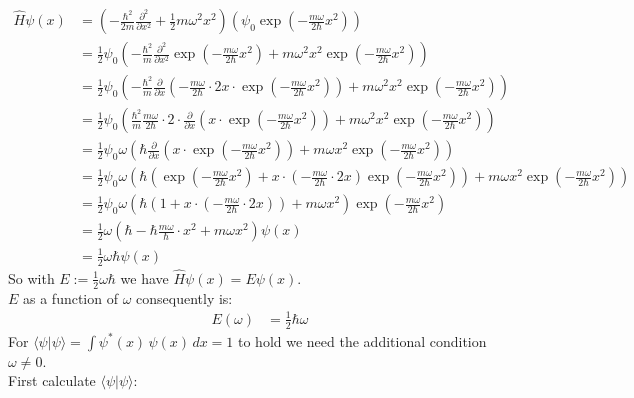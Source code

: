 \documentclass{article}
\begin{document}
  \begin{align*}
      \hat{H}\psi(x) &= \left(-\frac{\hbar^2}{2m}\frac{\partial^2}{\partial x^2} + \frac{1}{2}m\omega^2x^2\right)\left(\psi_0\exp\left(-\frac{m\omega}{2\hbar}x^2\right)\right)\\
      &= \frac{1}{2}\psi_0\left(-\frac{\hbar^2}{m}\frac{\partial^2}{\partial x^2}\exp\left(-\frac{m\omega}{2\hbar}x^2\right) + m\omega^2x^2\exp\left(-\frac{m\omega}{2\hbar}x^2\right)\right)\\
      &= \frac{1}{2}\psi_0\left(-\frac{\hbar^2}{m}\frac{\partial}{\partial x}\left(-\frac{m\omega}{2\hbar}\cdot 2x\cdot\exp\left(-\frac{m\omega}{2\hbar}x^2\right)\right)  + m\omega^2x^2\exp\left(-\frac{m\omega}{2\hbar}x^2\right)\right)\\
      &= \frac{1}{2}\psi_0\left(\frac{\hbar^2}{m}\frac{m\omega}{2\hbar}\cdot 2\cdot \frac{\partial}{\partial x}\left(x\cdot\exp\left(-\frac{m\omega}{2\hbar}x^2\right)\right)  + m\omega^2x^2\exp\left(-\frac{m\omega}{2\hbar}x^2\right)\right)\\
      &= \frac{1}{2}\psi_0\omega\left(\hbar\frac{\partial}{\partial x}\left(x\cdot\exp\left(-\frac{m\omega}{2\hbar}x^2\right)\right)  + m\omega x^2\exp\left(-\frac{m\omega}{2\hbar}x^2\right)\right)\\
      &= \frac{1}{2}\psi_0\omega\left(\hbar\left(\exp\left(-\frac{m\omega}{2\hbar}x^2\right) + x\cdot\left(-\frac{m\omega}{2\hbar}\cdot 2x\right)\exp\left(-\frac{m\omega}{2\hbar}x^2\right)\right)  + m\omega x^2\exp\left(-\frac{m\omega}{2\hbar}x^2\right)\right)\\
      &= \frac{1}{2}\psi_0\omega\left(\hbar\left(1 + x\cdot\left(-\frac{m\omega}{2\hbar}\cdot 2x\right)\right)  + m\omega x^2\right)\exp\left(-\frac{m\omega}{2\hbar}x^2\right)\\
      &= \frac{1}{2}\omega\left(\hbar - \hbar\frac{m\omega}{\hbar}\cdot x^2  + m\omega x^2\right)\psi(x)\\
      &= \frac{1}{2}\omega\hbar\psi(x)
  \end{align*}
  So with $E := \frac{1}{2}\omega\hbar$ we have $\hat{H}\psi(x) = E\psi(x)$.\\
  $E$ as a function of $\omega$ consequently is:
  \begin{align*}
      E(\omega) &= \frac{1}{2}\hbar\omega
  \end{align*}
  For $\langle\psi|\psi\rangle = \int\psi^{*}(x)\,\psi(x)\, dx = 1$ to hold we need the additional condition $\omega \neq 0$.\\
  First calculate $\langle\psi|\psi\rangle$:
\end{document}
